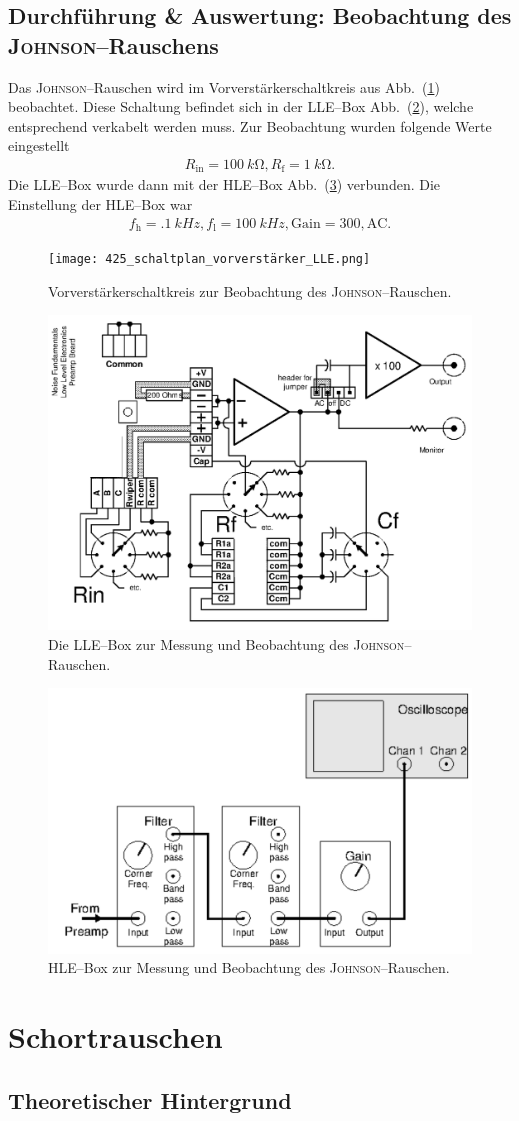 \documentclass[sn-mathphys-num,iicol]{sn-jnl}
\theoremstyle{thmstyleone}
\theoremstyle{thmstyletwo}
\theoremstyle{thmstylethree}
\begin{document}
\subsection{Durchführung \& Auswertung: Beobachtung des \textsc{Johnson}--Rauschens}
Das \textsc{Johnson}--Rauschen wird im Vorverstärkerschaltkreis aus Abb.\ (\ref{fig:vorverstärker}) beobachtet.
Diese Schaltung befindet sich in der LLE--Box Abb.\ (\ref{fig:johnson_lle}), welche entsprechend verkabelt werden muss.
Zur Beobachtung wurden folgende Werte eingestellt
\begin{align} 
        R_\text{in}=\SI{100}{k\ohm},R_\text{f}=\SI{1}{k\ohm}
.\end{align} 
Die LLE--Box wurde dann mit der HLE--Box Abb.\ (\ref{fig:johnson_hle}) verbunden.
Die Einstellung der HLE--Box war
\begin{align} 
        f_\text{h}=\SI{.1}{kHz},f_\text{l}=\SI{100}{kHz},\text{Gain}=300,\text{AC}
.\end{align} 

\begin{figure}[t]
        \centering
        \texttt{[image: 425\_schaltplan\_vorverstärker\_LLE.png]}
        \caption{Vorverstärkerschaltkreis zur Beobachtung des \textsc{Johnson}--Rauschen.\cite{anleitung425}} \label{fig:vorverstärker}
\end{figure}

\begin{figure}[t]
        \centering
        \includegraphics[width=.5\textwidth]{425_schaltplan_johnson_LLE.png}
        \caption{Die LLE--Box zur Messung und Beobachtung des \textsc{Johnson}--Rauschen.\cite{anleitung425}} \label{fig:johnson_lle}
\end{figure}

\begin{figure}[t]
        \centering
        \includegraphics[width=.5\textwidth]{425_schaltplan_visualisierung_johnson_HLE.png}
        \caption{HLE--Box zur Messung und Beobachtung des \textsc{Johnson}--Rauschen.\cite{anleitung425}} \label{fig:johnson_hle}
\end{figure}

\section{Schortrauschen}
\subsection{Theoretischer Hintergrund}



\end{document}
